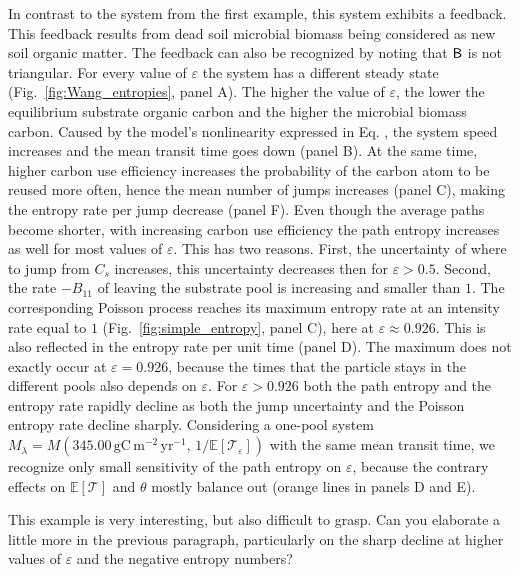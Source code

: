 \documentclass[smallextended]{svjour3}
\makeatletter
\renewcommand*{\eqref}[1]{%
  \hyperref[{#1}]{\textup{\tagform@{\ref*{#1}}}}%
}
\newcommand{\E}{\mathbb{E}}
\newcommand{\TT}{\mathcal{T}}
\newcommand{\gC}{\mathrm{gC}}
\newcommand{\yr}{\mathrm{yr}}
\newcommand{\meter}{\mathrm{m}}
\makeatother
\begin{document}
In contrast to the system from the first example, this system exhibits a feedback.
This feedback results from dead soil microbial biomass being considered as new soil organic matter.
The feedback can also be recognized by noting that $\mathsf{B}$ is not triangular.
For every value of $\varepsilon$ the system has a different steady state (Fig.~\ref{fig:Wang_entropies}, panel A).
The higher the value of $\varepsilon$, the lower the equilibrium substrate organic carbon and the higher the microbial biomass carbon.
Caused by the model's nonlinearity expressed in Eq. \eqref{eqn:lambdax}, the system speed increases and the mean transit time goes down (panel B).
At the same time, higher carbon use efficiency increases the probability of the carbon atom to be reused more often, hence the mean number of jumps increases (panel C), making the entropy rate per jump decrease (panel F).
Even though the average paths become shorter, with increasing carbon use efficiency the path entropy increases as well for most values of $\varepsilon$.
This has two reasons.
First, the uncertainty of where to jump from $C_s$ increases, this uncertainty decreases then for $\varepsilon>0.5$.
Second, the rate $-B_{11}$ of leaving the substrate pool is increasing and smaller than $1$.
The corresponding Poisson process reaches its maximum entropy rate at an intensity rate equal to $1$ (Fig.~\ref{fig:simple_entropy}, panel C), here at $\varepsilon\approx0.926$.
This is also reflected in the entropy rate per unit time (panel D).
The maximum does not exactly occur at $\varepsilon=0.926$, because the times that the particle stays in the different pools also depends on $\varepsilon$.
For $\varepsilon>0.926$ both the path entropy and the entropy rate rapidly decline as both the jump uncertainty and the Poisson entropy rate decline sharply.
Considering a one-pool system $M_\lambda=M(345.00\,\gC\,\meter^{-2}\,\yr^{-1},\, 1/\E\left[\TT_\varepsilon\right])$ with the same mean transit time, we recognize only small sensitivity of the path entropy on $\varepsilon$, because the contrary effects on $\E\left[\TT\right]$ and $\theta$ mostly balance out (orange lines in panels D and E).

{\color{blue} This example is very interesting, but also difficult to grasp. Can you elaborate a little more in the previous paragraph, particularly on the sharp decline at higher values of $\varepsilon$ and the negative entropy numbers?}
\end{document}
